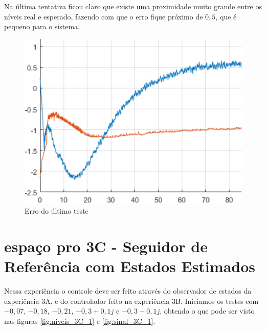 \documentclass[
	12pt,				%
	openany,			%
	oneside,			%
	a4paper,			%
	english,			%
	french,				%
	spanish,			%
	brazil,				%
	]{abntex2}
\begin{document}
{Na última tentativa ficou claro que existe uma proximidade muito grande entre os níveis real e esperado, fazendo com que o erro fique próximo de $0,5$, que é pequeno para o sistema.

\begin{figure}
	\centering
	\includegraphics[scale=0.45]{imagens/3B_2_erro.png}
    \caption{Erro do último teste}
	\label{fig:erro_3B_2}
\end{figure}

\clearpage
\section{espaço pro 3C - Seguidor de Referência com Estados Estimados}

Nessa experiência o controle deve ser feito através do observador de estados da experiência 3A, e do controlador feito na experiência 3B. Iniciamos os testes com $-0,07$, $-0,18$, $-0,21$, $-0,3+0,1j$ e $-0,3-0,1j$, obtendo o que pode ser visto nas figuras \ref{fig:niveis_3C_1} e \ref{fig:sinal_3C_1}.

}
\end{document}
